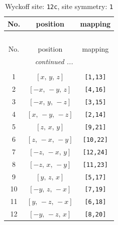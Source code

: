 \documentclass[fleqn,8pt]{jsarticle}
\begin{document}
\begin{longtable}{ccc}
\caption{Wyckoff site: {\tt 12c}, site symmetry: {\tt 1}}
 \\
 \hline \hline
No. & position & mapping \\ \hline \endfirsthead

\multicolumn{2}{l}{\tablename\ \thetable{}} \\
 \hline \hline
No. & position & mapping \\ \hline \endhead

 \hline \hline
\multicolumn{2}{r}{\footnotesize\it continued ...} \\ \endfoot

 \hline \hline
\multicolumn{2}{r}{} \\ \endlastfoot

1 & $\left[ x,\, y,\, z \right]$ & {\tt [1,13]} \\ \hline
2 & $\left[ - x,\, - y,\, z \right]$ & {\tt [4,16]} \\ \hline
3 & $\left[ - x,\, y,\, - z \right]$ & {\tt [3,15]} \\ \hline
4 & $\left[ x,\, - y,\, - z \right]$ & {\tt [2,14]} \\ \hline
5 & $\left[ z,\, x,\, y \right]$ & {\tt [9,21]} \\ \hline
6 & $\left[ z,\, - x,\, - y \right]$ & {\tt [10,22]} \\ \hline
7 & $\left[ - z,\, - x,\, y \right]$ & {\tt [12,24]} \\ \hline
8 & $\left[ - z,\, x,\, - y \right]$ & {\tt [11,23]} \\ \hline
9 & $\left[ y,\, z,\, x \right]$ & {\tt [5,17]} \\ \hline
10 & $\left[ - y,\, z,\, - x \right]$ & {\tt [7,19]} \\ \hline
11 & $\left[ y,\, - z,\, - x \right]$ & {\tt [6,18]} \\ \hline
12 & $\left[ - y,\, - z,\, x \right]$ & {\tt [8,20]} \\
\end{longtable}
\end{document}
